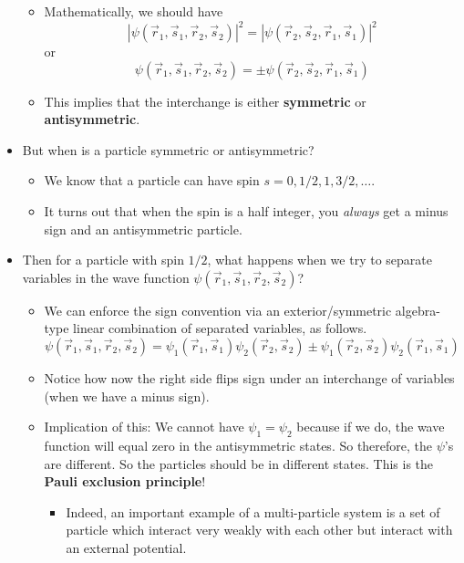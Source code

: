 \documentclass[../notes.tex]{subfiles}
\begin{document}
\begin{itemize}
\begin{itemize}
        \item Mathematically, we should have
        \begin{equation*}
            |\psi(\vec{r}_1,\vec{s}_1,\vec{r}_2,\vec{s}_2)|^2 = |\psi(\vec{r}_2,\vec{s}_2,\vec{r}_1,\vec{s}_1)|^2
        \end{equation*}
        or
        \begin{equation*}
            \psi(\vec{r}_1,\vec{s}_1,\vec{r}_2,\vec{s}_2) = \pm\psi(\vec{r}_2,\vec{s}_2,\vec{r}_1,\vec{s}_1)
        \end{equation*}
        \item This implies that the interchange is either \textbf{symmetric} or \textbf{antisymmetric}.
    \end{itemize}
    \item But when is a particle symmetric or antisymmetric?
    \begin{itemize}
        \item We know that a particle can have spin $s=0,1/2,1,3/2,\dots$.
        \item It turns out that when the spin is a half integer, you \emph{always} get a minus sign and an antisymmetric particle.
    \end{itemize}
    \item Then for a particle with spin $1/2$, what happens when we try to separate variables in the wave function $\psi(\vec{r}_1,\vec{s}_1,\vec{r}_2,\vec{s}_2)$?
    \begin{itemize}
        \item We can enforce the sign convention via an exterior/symmetric algebra-type linear combination of separated variables, as follows.
        \begin{equation*}
            \psi(\vec{r}_1,\vec{s}_1,\vec{r}_2,\vec{s}_2) = \psi_1(\vec{r}_1,\vec{s}_1)\psi_2(\vec{r}_2,\vec{s}_2)\pm\psi_1(\vec{r}_2,\vec{s}_2)\psi_2(\vec{r}_1,\vec{s}_1)
        \end{equation*}
        \item Notice how now the right side flips sign under an interchange of variables (when we have a minus sign).
        \item Implication of this: We cannot have $\psi_1=\psi_2$ because if we do, the wave function will equal zero in the antisymmetric states. So therefore, the $\psi$'s are different. So the particles should be in different states. This is the \textbf{Pauli exclusion principle}!
        \begin{itemize}
            \item Indeed, an important example of a multi-particle system is a set of particle which interact very weakly with each other but interact with an external potential.

\end{itemize}
\end{itemize}
\end{itemize}
\end{document}
